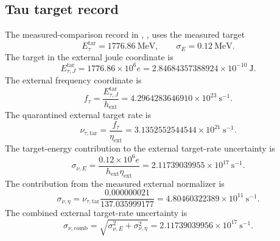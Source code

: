 \subsection{Tau target record}\label{manual:external-comparison:tau-target-normalization}
The measured-comparison record in , , uses the measured target
\[
E_\tau^{\mathrm{tar}}=1776.86\ \mathrm{MeV},
\qquad
\sigma_E=0.12\ \mathrm{MeV}.
\]
The target in the external joule coordinate is
\[
E_{\tau,J}^{\mathrm{tar}}
=
1776.86\times10^6 e
=
2.84684357388924\times10^{-10}\ \mathrm J.
\]
The external frequency coordinate is
\[
f_\tau
=
\frac{E_{\tau,J}^{\mathrm{tar}}}{h_{\mathrm{ext}}}
=
4.2964283646910\times10^{23}\ \mathrm{s}^{-1}.
\]
The quarantined external target rate is
\[
\nu_{\tau,\mathrm{tar}}
=
\frac{f_\tau}{\eta_{\mathrm{ext}}}
=
3.1352552544544\times10^{21}\ \mathrm{s}^{-1}.
\]
The target-energy contribution to the external target-rate uncertainty is
\[
\sigma_{\nu,E}
=
\frac{0.12\times10^6e}{h_{\mathrm{ext}}\eta_{\mathrm{ext}}}
=
2.11739039955\times10^{17}\ \mathrm{s}^{-1}.
\]
The contribution from the measured external normalizer is
\[
\sigma_{\nu,\eta}
=
\nu_{\tau,\mathrm{tar}}
\frac{0.000000021}{137.035999177}
=
4.80460322389\times10^{11}\ \mathrm{s}^{-1}.
\]
The combined external target-rate uncertainty is
\[
\sigma_{\nu,\mathrm{comb}}
=
\sqrt{\sigma_{\nu,E}^2+\sigma_{\nu,\eta}^2}
=
2.11739039956\times10^{17}\ \mathrm{s}^{-1}.
\]

